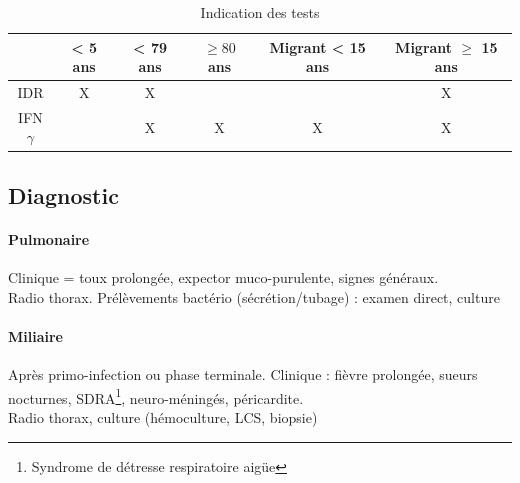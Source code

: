 \documentclass{article}
\begin{document}
\begin{table}[htpb]
  \centering
  \caption{Indication des tests}
  \begin{tabular}{*{6}{c}}
    \toprule
  & < 5 ans & < 79 ans & $\ge 80$ ans & Migrant < 15 ans & Migrant $\ge$ 15 ans \\
  \midrule
  IDR         & X & X &   &   & X \\
  IFN$\gamma$ &   & X & X & X & X \\
  \bottomrule
  \end{tabular}
\end{table}

\subsection{Diagnostic}%

\paragraph{Pulmonaire} Clinique = toux prolongée, expector muco-purulente,
signes généraux.\\
Radio thorax. Prélèvements bactério (sécrétion/tubage) : examen direct, culture

\paragraph{Miliaire} Après primo-infection ou phase terminale.
Clinique : fièvre prolongée, sueurs nocturnes, SDRA\footnote{Syndrome de
détresse respiratoire aigüe}, neuro-méningés,
péricardite.\\
Radio thorax, culture (hémoculture, LCS, biopsie)
\end{document}
